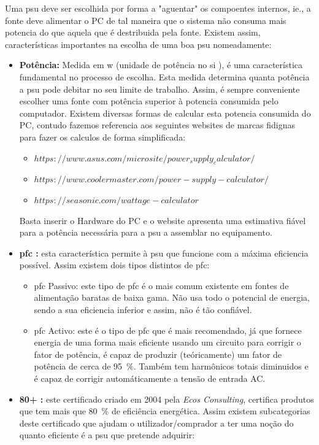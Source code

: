 Uma \ac{psu} deve ser escolhida por forma a \textsf{"aguentar"} os compoentes internos, ie., a fonte deve alimentar o PC de tal maneira que o sistema não consuma mais potencia do que aquela que é destribuida pela fonte. Existem assim, características importantes na escolha de uma boa \ac{psu} nomeadamente:
	\begin{itemize}
	\item \textbf{Potência:} Medida em \ac{w} (unidade de potência no \ac{si} ), é uma característica fundamental no processo de escolha. Esta medida determina quanta potência a \ac{psu} pode debitar no seu limite de trabalho. Assim, é sempre conveniente escolher uma fonte com potência superior à potencia consumida pelo computador. Existem diversas formas de calcular esta potencia consumida do PC, contudo fazemos referencia aos seguintes websites de marcas fidignas para fazer os calculos de forma simplificada: 
		\begin{itemize}
		\item $https://www.asus.com/microsite/power_supply_calculator/$
		\item $https://www.coolermaster.com/power-supply-calculator/$
		\item $https://seasonic.com/wattage-calculator$
		\end{itemize}
	Basta inserir o Hardware do PC e o website apresenta uma estimativa fiável para a potência necessária para a \ac{psu} a assemblar no equipamento.
	\item \textbf{\ac{pfc} :} esta característica permite à \ac{psu} que funcione com a máxima eficiencia possível. Assim existem dois tipos distintos de \ac{pfc}:
		\begin{itemize}
		\item{\ac{pfc} Passivo:} este tipo de \ac{pfc} é o mais comum existente em fontes de alimentação baratas de baixa gama. Não usa todo o potencial de energia, sendo a sua eficiencia inferior e assim, não é tão confiável.
		\item{\ac{pfc} Activo:} este é o tipo de \ac{pfc} que é mais recomendado, já que fornece energia de uma forma mais eficiente usando um circuito para corrigir o fator de potência, é capaz de produzir (teóricamente) um fator de potência de cerca de 95~\%. Também tem harmônicos totais diminuidos e é capaz de corrigir automáticamente a tensão de entrada AC.
		\end{itemize}
	\item \textbf{\ac{80+} :} este certificado criado em 2004 pela \textit{Ecos Consulting}, certifica produtos que tem mais que 80~\% de eficiência energética. Assim existem subcategorias deste certificado que ajudam o utilizador/comprador a ter uma noção do quanto eficiente é a \ac{psu} que pretende adquirir:
	

\end{itemize}
